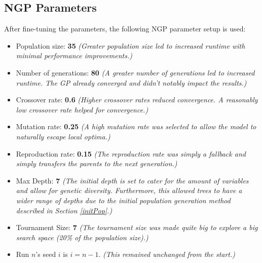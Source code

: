 \documentclass{article}
\begin{document}
\subsection{NGP Parameters}
After fine-tuning the parameters, the following NGP parameter setup is used:
\begin{itemize}
  \item Population size: \textbf{35} \emph{(Greater population size led to increased runtime with minimal performance improvements.)}
  \item Number of generations: \textbf{80} \emph{(A greater number of generations led to increased runtime. The GP already converged and didn't notably impact the results.)}
  \item Crossover rate: \textbf{0.6} \emph{(Higher crossover rates reduced convergence. A reasonably low crossover rate helped for convergence.)}
  \item Mutation rate: \textbf{0.25} \emph{(A high mutation rate was selected to allow the model to naturally escape local optima.)}
  \item Reproduction rate: \textbf{0.15} \emph{(The reproduction rate was simply a fallback and simply transfers the parents to the next generation.)}
  \item Max Depth: \textbf{7} \emph{(The initial depth is set to cater for the amount of variables and allow for genetic diversity. Furthermore, this allowed trees to have a wider range of depths due to the initial population generation method described in Section \ref{initPop}.)} 
  \item Tournament Size: \textbf{7} \emph{(The tournament size was made quite big to explore a big search space (20\% of the population size).)}
  \item Run \(n\)'s seed \(i\) is \(i = n-1\). \emph{(This remained unchanged from the start.)}
\end{itemize}
\end{document}

